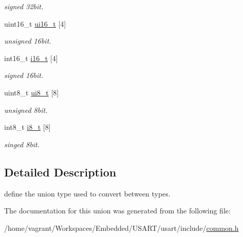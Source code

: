 \begin{DoxyCompactItemize}
\begin{DoxyCompactList}\small\item\em signed 32bit. \end{DoxyCompactList}\item 
\hypertarget{union_data_converter_ae96584b1dad4adab583405970fc89137}{uint16\+\_\+t \hyperlink{union_data_converter_ae96584b1dad4adab583405970fc89137}{ui16\+\_\+t} \mbox{[}4\mbox{]}}\label{union_data_converter_ae96584b1dad4adab583405970fc89137}

\begin{DoxyCompactList}\small\item\em unsigned 16bit. \end{DoxyCompactList}\item 
\hypertarget{union_data_converter_ad566a31830c516b559b9a3758ad39d82}{int16\+\_\+t \hyperlink{union_data_converter_ad566a31830c516b559b9a3758ad39d82}{i16\+\_\+t} \mbox{[}4\mbox{]}}\label{union_data_converter_ad566a31830c516b559b9a3758ad39d82}

\begin{DoxyCompactList}\small\item\em signed 16bit. \end{DoxyCompactList}\item 
\hypertarget{union_data_converter_a6576e61c59bc9d4e1b54f881fe5acdd4}{uint8\+\_\+t \hyperlink{union_data_converter_a6576e61c59bc9d4e1b54f881fe5acdd4}{ui8\+\_\+t} \mbox{[}8\mbox{]}}\label{union_data_converter_a6576e61c59bc9d4e1b54f881fe5acdd4}

\begin{DoxyCompactList}\small\item\em unsigned 8bit. \end{DoxyCompactList}\item 
\hypertarget{union_data_converter_a0b79bc0f32d5bc76317f226dfc1a0325}{int8\+\_\+t \hyperlink{union_data_converter_a0b79bc0f32d5bc76317f226dfc1a0325}{i8\+\_\+t} \mbox{[}8\mbox{]}}\label{union_data_converter_a0b79bc0f32d5bc76317f226dfc1a0325}

\begin{DoxyCompactList}\small\item\em singed 8bit. \end{DoxyCompactList}\end{DoxyCompactItemize}


\subsection{Detailed Description}
define the union type used to convert between types. 

The documentation for this union was generated from the following file\+:\begin{DoxyCompactItemize}
\item 
/home/vagrant/\+Workspaces/\+Embedded/\+U\+S\+A\+R\+T/usart/include/\hyperlink{common_8h}{common.\+h}\end{DoxyCompactItemize}
